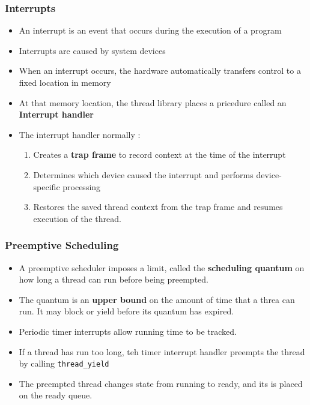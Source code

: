 \documentclass[twoside]{article}
\begin{document}
\subsubsection{Interrupts}
\begin{itemize}
\item An interrupt is an event that occurs during the execution of a program
\item Interrupts are caused by system devices
\item When an interrupt occurs, the hardware automatically transfers control to a fixed location in memory
\item At that memory location, the thread library places a pricedure called an \textbf{Interrupt handler}
\item The interrupt handler normally : 
\begin{enumerate}
\item Creates a \textbf{trap frame} to record context at the time of the interrupt 
\item Determines which device caused the interrupt and performs device-specific processing
\item Restores the saved thread context from the trap frame and resumes execution of the thread. 
\end{enumerate}
\end{itemize}

\subsubsection{Preemptive Scheduling}
\begin{itemize}
\item A preemptive scheduler imposes a limit, called the \textbf{scheduling quantum} on how long a thread can run before being preempted. 
\item The quantum is an \textbf{upper bound} on the amount of time that a threa can run. It may block or yield before its quantum has expired. 
\item Periodic timer interrupts allow running time to be tracked.
\item If a thread has run too long, teh timer interrupt handler preempts the thread by calling \verb|thread_yield|
\item The preempted thread changes state from running to ready, and its is placed on the ready queue. 
\end{itemize}
\end{document}
